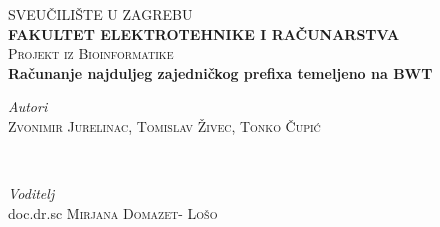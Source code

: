 \documentclass[11pt]{article}
\begin{document}

\begin{titlepage} %
	
	\center %
	
	
	\textsc{\LARGE SVEU\v{C}ILI\v{S}TE U ZAGREBU}\\[0.4cm] %
	\textsc{\LARGE \textbf{FAKULTET ELEKTROTEHNIKE I RA\v{C}UNARSTVA}}\\[2.5cm]
    
	\textsc{\Large Projekt iz Bioinformatike}\\[0.5cm] %
	

	
	
	{\huge\bfseries Ra\v{c}unanje najduljeg zajedni\v{c}kog prefixa temeljeno na BWT}\\[1.2cm] %
	
	
	\begin{minipage}{2.5\textwidth}
		\begin{flushleft}
			\large
			\textit{Autori}\\
			 \textsc{Zvonimir Jurelinac, Tomislav Živec, Tonko Čupić} %
		\end{flushleft}
	\end{minipage}
	~\\[0.2cm]
	\begin{minipage}{2.5\textwidth}
		\begin{flushleft}
			\large
			\textit{Voditelj}\\
			doc.dr.sc \textsc{Mirjana Domazet- Lo\v{s}o} %
		\end{flushleft}
	\end{minipage}
	
	

\end{titlepage}
\end{document}
